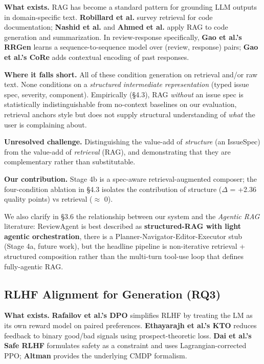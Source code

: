 \documentclass[sigconf, nonacm, anonymous, balance=false]{acmart}
\begin{document}
\textbf{What exists.} RAG \cite{lewis2020rag} has become a standard pattern for grounding LLM outputs in domain-specific text. \textbf{Robillard et al.} \cite{robillard2017demand} survey retrieval for code documentation; \textbf{Nashid et al.} \cite{nashid2023codequery} and \textbf{Ahmed et al.} \cite{ahmed2024automatic} apply RAG to code generation and summarization. In review-response specifically, \textbf{Gao et al.'s RRGen} \cite{gao2019rrgen} learns a sequence-to-sequence model over (review, response) pairs; \textbf{Gao et al.'s CoRe} \cite{gao2020core} adds contextual encoding of past responses.

\textbf{Where it falls short.} All of these condition generation on retrieval and/or raw text. None conditions on a \emph{structured intermediate representation} (typed issue spec, severity, component). Empirically (\S4.3), RAG \emph{without} an issue spec is statistically indistinguishable from no-context baselines on our evaluation, retrieval anchors style but does not supply structural understanding of \emph{what} the user is complaining about.

\textbf{Unresolved challenge.} Distinguishing the value-add of \emph{structure} (an IssueSpec) from the value-add of \emph{retrieval} (RAG), and demonstrating that they are complementary rather than substitutable.

\textbf{Our contribution.} Stage 4b is a spec-aware retrieval-augmented composer; the four-condition ablation in \S4.3 isolates the contribution of structure ($\Delta$ = +2.36 quality points) vs retrieval ($\approx$ 0).

We also clarify in \S3.6 the relationship between our system and the \emph{Agentic RAG} literature: ReviewAgent is best described as \textbf{structured-RAG with light agentic orchestration}, there is a Planner-Navigator-Editor-Executor stub (Stage 4a, future work), but the headline pipeline is non-iterative retrieval + structured composition rather than the multi-turn tool-use loop that defines fully-agentic RAG.

\subsection{RLHF Alignment for Generation (RQ3)}\label{rlhf-alignment-for-generation-gap-g5}

\textbf{What exists.} \textbf{Rafailov et al.'s DPO} \cite{rafailov2023} simplifies RLHF by treating the LM as its own reward model on paired preferences. \textbf{Ethayarajh et al.'s KTO} \cite{ethayarajh2024} reduces feedback to binary good/bad signals using prospect-theoretic loss. \textbf{Dai et al.'s Safe RLHF} \cite{dai2023} formulates safety as a constraint and uses Lagrangian-corrected PPO; \textbf{Altman} \cite{altman1999} provides the underlying CMDP formalism.
\end{document}
